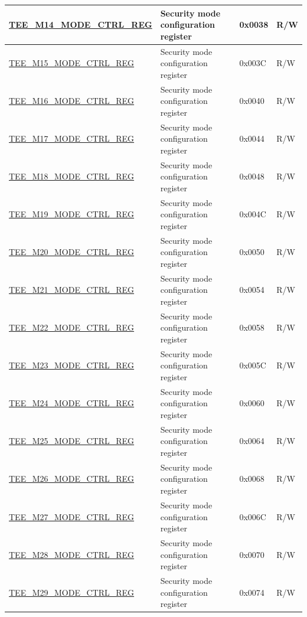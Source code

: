 \begin{longtable}{ | l | L{6cm} | l | l | }
\hyperref[regdesc:TEEMNMODECTRLREG]{TEE\_M14\_MODE\_CTRL\_REG} & Security mode configuration register & 0x0038 & R/W \\ \hline
\hyperref[regdesc:TEEMNMODECTRLREG]{TEE\_M15\_MODE\_CTRL\_REG} & Security mode configuration register & 0x003C & R/W \\ \hline
\hyperref[regdesc:TEEMNMODECTRLREG]{TEE\_M16\_MODE\_CTRL\_REG} & Security mode configuration register & 0x0040 & R/W \\ \hline
\hyperref[regdesc:TEEMNMODECTRLREG]{TEE\_M17\_MODE\_CTRL\_REG} & Security mode configuration register & 0x0044 & R/W \\ \hline
\hyperref[regdesc:TEEMNMODECTRLREG]{TEE\_M18\_MODE\_CTRL\_REG} & Security mode configuration register & 0x0048 & R/W \\ \hline
\hyperref[regdesc:TEEMNMODECTRLREG]{TEE\_M19\_MODE\_CTRL\_REG} & Security mode configuration register & 0x004C & R/W \\ \hline
\hyperref[regdesc:TEEMNMODECTRLREG]{TEE\_M20\_MODE\_CTRL\_REG} & Security mode configuration register & 0x0050 & R/W \\ \hline
\hyperref[regdesc:TEEMNMODECTRLREG]{TEE\_M21\_MODE\_CTRL\_REG} & Security mode configuration register & 0x0054 & R/W \\ \hline
\hyperref[regdesc:TEEMNMODECTRLREG]{TEE\_M22\_MODE\_CTRL\_REG} & Security mode configuration register & 0x0058 & R/W \\ \hline
\hyperref[regdesc:TEEMNMODECTRLREG]{TEE\_M23\_MODE\_CTRL\_REG} & Security mode configuration register & 0x005C & R/W \\ \hline
\hyperref[regdesc:TEEMNMODECTRLREG]{TEE\_M24\_MODE\_CTRL\_REG} & Security mode configuration register & 0x0060 & R/W \\ \hline
\hyperref[regdesc:TEEMNMODECTRLREG]{TEE\_M25\_MODE\_CTRL\_REG} & Security mode configuration register & 0x0064 & R/W \\ \hline
\hyperref[regdesc:TEEMNMODECTRLREG]{TEE\_M26\_MODE\_CTRL\_REG} & Security mode configuration register & 0x0068 & R/W \\ \hline
\hyperref[regdesc:TEEMNMODECTRLREG]{TEE\_M27\_MODE\_CTRL\_REG} & Security mode configuration register & 0x006C & R/W \\ \hline
\hyperref[regdesc:TEEMNMODECTRLREG]{TEE\_M28\_MODE\_CTRL\_REG} & Security mode configuration register & 0x0070 & R/W \\ \hline
\hyperref[regdesc:TEEMNMODECTRLREG]{TEE\_M29\_MODE\_CTRL\_REG} & Security mode configuration register & 0x0074 & R/W \\ \hline

\end{longtable}
